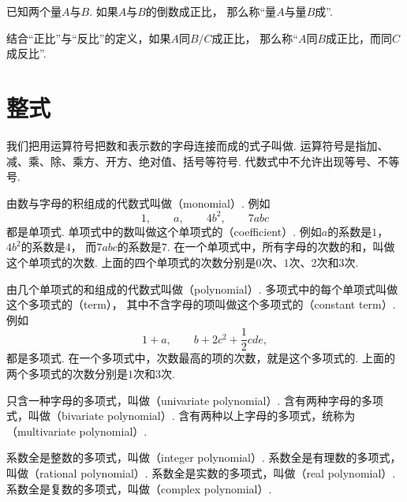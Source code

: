 \begin{definition}
已知两个量\(A\)与\(B\).
如果\(A\)与\(B\)的倒数成正比，
那么称“量\(A\)与量\(B\)成”.
\end{definition}

结合“正比”与“反比”的定义，如果\(A\)同\(B/C\)成正比，
那么称“\(A\)同\(B\)成正比，而同\(C\)成反比”.

\section{整式}
我们把用运算符号把数和表示数的字母连接而成的式子叫做.
运算符号是指加、减、乘、除、乘方、开方、绝对值、括号等符号.
代数式中不允许出现等号、不等号.

由数与字母的积组成的代数式叫做（monomial）.
例如\[
	1, \qquad
	a, \qquad
	4b^2, \qquad
	7abc
\]都是单项式.
单项式中的数叫做这个单项式的（coefficient）.
例如\(a\)的系数是\(1\)，
\(4b^2\)的系数是\(4\)，
而\(7abc\)的系数是\(7\).
在一个单项式中，所有字母的次数的和，叫做这个单项式的次数.
上面的四个单项式的次数分别是\(0\)次、\(1\)次、\(2\)次和\(3\)次.

由几个单项式的和组成的代数式叫做（polynomial）.
多项式中的每个单项式叫做这个多项式的（term），
其中不含字母的项叫做这个多项式的（constant term）.
例如\[
	1+a, \qquad
	b+2c^2+\frac12cde,
\]都是多项式.
在一个多项式中，次数最高的项的次数，就是这个多项式的.
上面的两个多项式的次数分别是\(1\)次和\(3\)次.

只含一种字母的多项式，叫做（univariate polynomial）.
含有两种字母的多项式，叫做（bivariate polynomial）.
含有两种以上字母的多项式，统称为（multivariate polynomial）.

系数全是整数的多项式，叫做（integer polynomial）.
系数全是有理数的多项式，叫做（rational polynomial）.
系数全是实数的多项式，叫做（real polynomial）.
系数全是复数的多项式，叫做（complex polynomial）.

